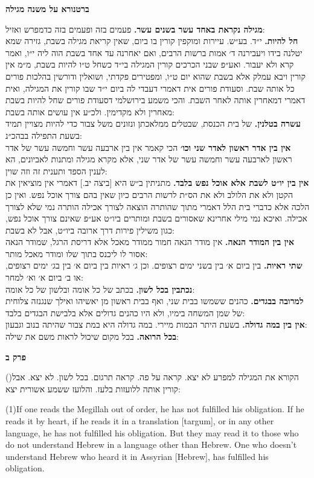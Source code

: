 \documentclass[12pt, openany]{book}
\newcommand{\sethebfont}{
\fontsize{10.5pt}{13.1pt} \selectfont
}
\newcommand{\LTRmark}{‎}
\newcommand{\hebeng}[2]{
	{\sethebfont #1}
	
	{\beginL\englishfont\sethebfont{\raggedright #2 \hfill} \LTRmark\endL}
	
	\vspace{\baselineskip}
}
\newcommand{\chapname}{}
\newcommand{\sectname}{}
\newcommand{\newchap}[1]{
	\addcontentsline{toc}{chapter}{#1}
	\renewcommand{\chapname}{#1}
		\begin{center}
			\textbf{%
\fontsize{16pt}{16pt}\selectfont
				#1}
		\end{center}
}
\newcommand{\newsection}[1]{
	\renewcommand{\sectname}{#1}	
	\vspace{-\baselineskip}
	\begin{center}
		\textbf{%
\fontsize{16pt}{16pt}\selectfont
			#1}
	\end{center}
	\vspace{-\baselineskip}
	\nopagebreak
}
\newcommand{\blockcomment}[2]{ 
\vspace{\baselineskip}
\newsection{#1}
\sethebfont	\textsf{#2}
\vspace{\baselineskip}}
\newcommand{\vsnum}[1]{(\hebrewnumeral{#1})\space}
\newcommand{\vsnumeng}[1]{(#1)\space}
\begin{document}
\blockcomment{ברטנורא על משנה מגילה}{\textrm{\textbf{מגילה נקראת באחד עשר בשנים עשר.}} פעמים בזה ופעמים בזה כדמפרש ואזיל:\\\textrm{\textbf{חל להיות.}} י״ד. בע״ש. עיירות ומוקפין קורין בו ביום, שאין קריאת מגילה בשבת, גזירה שמא יטלנה בידו ויעבירנה ד׳ אמות ברשות הרבים, ואם יאחרנה עד אחד בשבת הוה ליה י״ו, ואמר קרא ולא יעבור. ואע״פ שבני הכרכים קורין המגילה בי״ד כשחל ט״ו להיות בשבת, מ״מ אין קורין ויבא עמלק אלא בשבת שהוא יום ט״ו, ומפטירים פקדתי, ושואלין ודורשין בהלכות פורים כל אותה שבת. וסעודת פורים אית דאמרי דעבדי לה ביום י״ד שבו קורין את המגילה, ואית דאמרי דמאחרין אותה לאחר השבת. והכי משמע בירושלמי דסעודת פורים שחל להיות בשבת מאחרין ולא מקדימין. ולכ״ע אין עושים אותה בשבת:\\\textrm{\textbf{עשרה בטלנין.}} של בית הכנסת, שבטלים ממלאכתן ונזונים משל צבור כדי להיות מצויין תמיד בשעת התפילה בבהכ״נ:\\\textrm{\textbf{אין בין אדר ראשון לאדר שני וכו׳}} הכי קאמר אין בין ארבעה עשר וחמשה עשר של אדר ראשון לארבעה עשר וחמשה עשר של אדר שני, אלא מקרא מגילה ומתנות לאביונים, הא לענין הספד ותענית זה וזה שוין: \\\textrm{\textbf{אין בין יו״ט לשבת אלא אוכל נפש בלבד.}} מתניתין ב״ש היא [ביצה יב.] דאמרי אין מוציאין את הקטן ולא את הלולב ולא את הס״ת לרשות הרבים כיון שאין בהם צורך אוכל נפש. ואין כן הלכה אלא כדברי בית הלל דאמרי מתוך שהותרה הוצאה לצורך אכילה הותרה נמי שלא לצורך אכילה. ואיכא נמי מילי אחרינא שאסורים בשבת ומותרים ביו״ט אע״פ שאינם צורך אוכל נפש, כגון משילין פירות דרך ארובה ביו״ט, אבל לא בשבת:\\\textrm{\textbf{אין בין המודר הנאה.}} אין מודר הנאה חמור ממודר מאכל אלא דריסת הרגל, שמודר הנאה אסור לו ליכנס בתוך שלו ומודר מאכל מותר:\\\textrm{\textbf{שתי ראיות.}} בין ביום א׳ בין בשני ימים רצופים. וכן ג׳ ראיות בין ביום א׳ בין בג׳ ימים רצופים, או ב׳ ביום א׳ וא׳ למחר:\\\textrm{\textbf{נכתבין בכל לשון.}} בכתב של כל אומה ובלשון של כל אומה:\\\textrm{\textbf{למרובה בבגדים.}} כהנים ששמשו בבית שני, ואף בבית ראשון מן יאשיהו ואילך שנגנזה צלוחית של שמן המשחה בימיו, ולא היו כהנים גדולים אלא בלבישת הבגדים בלבד:\\\textrm{\textbf{אין בין במה גדולה.}} בשעת היתר הבמות מיירי. במה גדולה היא במת צבור שהיתה בנוב וגבעון:\\\textrm{\textbf{בכל הרואה.}} בכל מקום שיכול לראות משם את שילה:\\
}%
\newchap{פרק ב}
\hebeng{\vsnum{1}הקורא את המגילה למפרע לא יצא. קראה על פה. קראה תרגום. בכל לשון. לא יצא. אבל קורין אותה ללועזות בלעז. והלועז ששמע אשורית יצא: }{\vsnumeng{1}If one reads the Megillah out of order, he has not fulfilled his obligation. If he reads it by heart, if he reads it in a translation {[targum]}, or in any other language, he has not fulfilled his obligation. But they may read it to those who do not understand Hebrew in a language other than Hebrew. One who doesn’t understand Hebrew who heard it in Assyrian {[Hebrew]}, has fulfilled his obligation.}%
\end{document}
